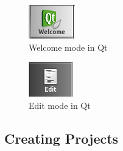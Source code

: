 \begin{figure}[h]
\begin{center}
\includegraphics[scale=0.8]{images/welcome.png}
\end{center}
\caption{Welcome mode in Qt}
\end{figure}
\begin{figure}[!h]
\begin{center}
\includegraphics[scale=0.8]{images/edit.png}
\caption{Edit mode in Qt}
\end{center}
\end{figure}

\newpage



\subsection{Creating Projects}

